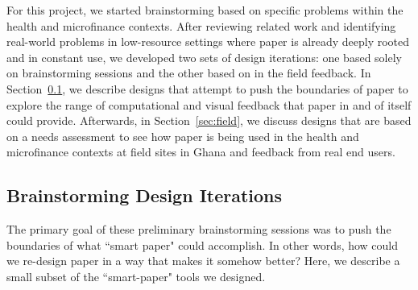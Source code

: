 \documentclass{sig-alternate}
\begin{document}
For this project, we started brainstorming based on specific problems within the health and microfinance contexts. After reviewing related work and identifying real-world problems in low-resource settings where paper is already deeply rooted and in constant use, we developed two sets of design iterations: one based solely on brainstorming sessions and the other based on in the field feedback. In Section~\ref{sec:brainstorming}, we describe designs that attempt to push the boundaries of paper to explore the range of computational and visual feedback that paper in and of itself could provide. Afterwards, in Section~\ref{sec:field}, we discuss designs that are based on a needs assessment to see how paper is being used in the health and microfinance contexts at field sites in Ghana and feedback from real end users.


\subsection{Brainstorming Design Iterations}
\label{sec:brainstorming}

The primary goal of these preliminary brainstorming sessions was to push the boundaries of what ``smart paper" could accomplish. In other words, how could we re-design paper in a way that makes it somehow better? Here, we describe a small subset of the ``smart-paper" tools we designed.
\end{document}
